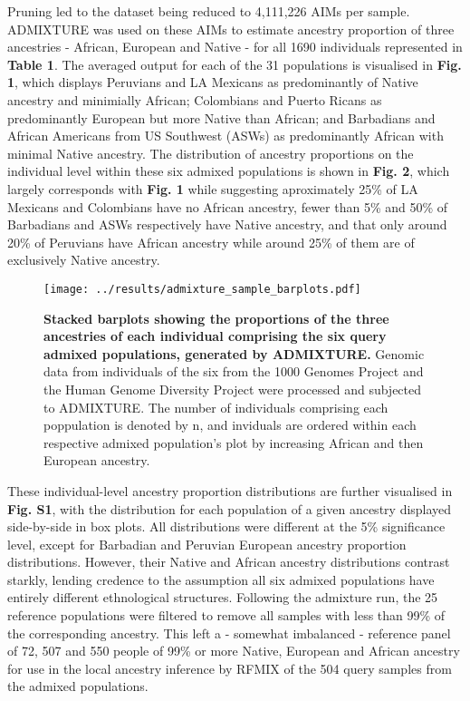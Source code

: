 \documentclass[11pt]{article}
\begin{document}
Pruning led to the dataset being reduced to 4,111,226 AIMs per sample. ADMIXTURE was used on these AIMs to estimate ancestry proportion of three ancestries - African, European and Native - for all 1690 individuals represented in \textbf{Table 1}. The averaged output for each of the 31 populations is visualised in \textbf{Fig. 1}, which displays Peruvians and LA Mexicans as predominantly of Native ancestry and minimially African; Colombians and Puerto Ricans as predominantly European but more Native than African; and Barbadians and African Americans from US Southwest (ASWs) as predominantly African with minimal Native ancestry.
The distribution of ancestry proportions on the individual level within these six admixed populations is shown in \textbf{Fig. 2}, which largely corresponds with \textbf{Fig. 1} while suggesting aproximately 25\% of LA Mexicans and Colombians have no African ancestry, fewer than 5\% and 50\% of Barbadians and ASWs respectively have Native ancestry, and that only around 20\% of Peruvians have African ancestry while around 25\% of them are of exclusively Native ancestry.




\begin{figure}[htb!]%
    \centering
    \texttt{[image: 
        ../results/admixture\_sample\_barplots.pdf]} 
    \vspace{-.25cm}
    \caption{\textbf{
        Stacked barplots showing the proportions of the three ancestries of each individual comprising the six query admixed populations, generated by ADMIXTURE.
    }
        Genomic data from individuals of the six from the 1000 Genomes Project and the Human Genome Diversity Project were processed and subjected to ADMIXTURE. The number of individuals comprising each poppulation is denoted by n, and inviduals are ordered within each respective admixed population's plot by increasing African and then European ancestry.
    }
\end{figure}





These individual-level ancestry proportion distributions are further visualised in \textbf{Fig. S1}, with the distribution for each population of a given ancestry displayed side-by-side in box plots. All distributions were different at the 5\% significance level, except for Barbadian and Peruvian European ancestry proportion distributions. However, their Native and African ancestry distributions contrast starkly, lending credence to the assumption all six admixed populations have entirely different ethnological structures.
Following the admixture run, the 25 reference populations were filtered to remove all samples with less than 99\% of the corresponding ancestry. This left a - somewhat imbalanced - reference panel of 72, 507 and 550 people of 99\% or more Native, European and African ancestry for use in the local ancestry inference by RFMIX of the 504 query samples from the admixed populations. 
\end{document}
